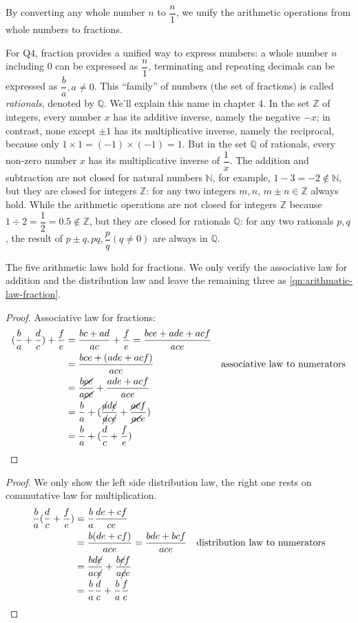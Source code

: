 \documentclass[b5paper]{article}
\begin{document}
By converting any whole number $n$ to $\dfrac{n}{1}$, we unify the arithmetic operations from whole numbers to fractions.

\vspace{3mm}
For Q4, fraction provides a unified way to express numbers: a whole number $n$ including 0 can be expressed as $\dfrac{n}{1}$, terminating and repeating decimals can be expressed as $\dfrac{b}{a}, a \ne 0$. This \enquote{family} of numbers (the set of fractions) is called \emph{rationals}, denoted by $\mathbb{Q}$. We'll explain this name in chapter 4. In the set $\mathbb{Z}$ of integers, every number $x$ has its additive inverse, namely the negative $-x$; in contrast, none except $\pm 1$ has its multiplicative inverse, namely the reciprocal, because only $1 \times 1 = (-1) \times (-1) = 1$. But in the set $\mathbb{Q}$ of rationals, every non-zero number $x$ has its multiplicative inverse of $\dfrac{1}{x}$. The addition and subtraction are not closed for natural numbers $\mathbb{N}$, for example, $1 - 3 = -2 \notin \mathbb{N}$, but they are closed for integers $\mathbb{Z}$: for any two integers $m, n$, $m \pm n \in \mathbb{Z}$ always hold. While the arithmetic operations are not closed for integers $\mathbb{Z}$ because $1 \div 2 = \dfrac{1}{2} = 0.5 \notin \mathbb{Z}$, but they are closed for rationals $\mathbb{Q}$: for any two rationals $p, q$, the result of $p \pm q, pq, \dfrac{p}{q} (q \ne 0)$ are always in $\mathbb{Q}$.

The five arithmetic laws hold for fractions. We only verify the associative law for addition and the distribution law and leave the remaining three as \cref{qn:arithmatic-law-fraction}.
\begin{proof}
Associative law for fractions:
\begin{align*}
(\frac{b}{a} + \frac{d}{c}) + \frac{f}{e} & = \frac{bc + ad}{ac} + \frac{f}{e} = \frac{bce + ade + acf}{ace} && \\
  & = \frac{bce + (ade + acf)}{ace} & \text{associative law to numerators} & \\
  & = \frac{b\cancel{ce}}{a\cancel{ce}} + \frac{ade + acf}{ace} && \\
  & = \frac{b}{a} + (\frac{\cancel{a}d\cancel{e}}{\cancel{a}c\cancel{e}} + \frac{\cancel{ac}f}{\cancel{ac}e}) && \\
  & = \frac{b}{a} + (\frac{d}{c} + \frac{f}{e}) && \qedhere
\end{align*}
\end{proof}

\begin{proof}
We only show the left side distribution law, the right one rests on commutative law for multiplication.
\begin{align*}
  \frac{b}{a}(\frac{d}{c} + \frac{f}{e}) &= \frac{b}{a}\frac{de + cf}{ce} && \\
    &= \frac{b(de + cf)}{ace} = \frac{bde + bcf}{ace} & \text{distribution law to numerators} & \\
    &= \frac{bd\cancel{e}}{ac\cancel{e}} + \frac{b\cancel{c}f}{a\cancel{c}e} && \\
    &= \frac{b}{a}\frac{d}{c} + \frac{b}{a}\frac{f}{e} && \qedhere
\end{align*}
\end{proof}
\end{document}
